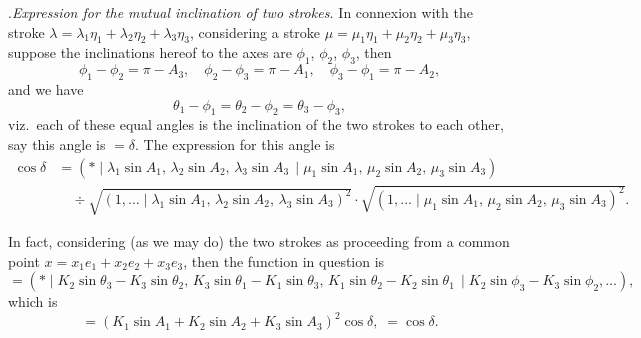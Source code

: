 \documentclass[11pt]{article}
\begin{document}
.\quad \textit{Expression for the mutual inclination of two strokes.} In connexion with the stroke $\lambda = \lambda_{1}\eta_{1} + \lambda_{2}\eta_{2} + \lambda_{3}\eta_{3}$, considering a stroke $\mu = \mu_{1}\eta_{1} + \mu_{2}\eta_{2} + \mu_{3}\eta_{3}$, suppose the inclinations hereof to the axes are $\phi_{1}$, $\phi_{2}$, $\phi_{3}$, then
\[
\phi_{1} - \phi_{2} = \pi - A_{3},\quad \phi_{2} - \phi_{3} = \pi - A_{1},\quad \phi_{3} - \phi_{1} = \pi - A_{2},
\]
and we have
\[
\theta_{1} - \phi_{1} = \theta_{2} - \phi_{2} = \theta_{3} - \phi_{3},
\]
viz.\ each of these equal angles is the inclination of the two strokes to each other, say this angle is $= \delta$. The expression for this angle is
\begin{align*}
\cos\delta &= (*\!\mid\lambda_{1}\sin A_{1},\,\lambda_{2}\sin A_{2},\,\lambda_{3}\sin A_{3}\,\mid\mu_{1}\sin A_{1},\,\mu_{2}\sin A_{2},\,\mu_{3}\sin A_{3}) \\
&\quad \div \sqrt{(1,\ldots\mid\lambda_{1}\sin A_{1},\,\lambda_{2}\sin A_{2},\,\lambda_{3}\sin A_{3})^{2}}\cdot\sqrt{(1,\ldots\mid\mu_{1}\sin A_{1},\,\mu_{2}\sin A_{2},\,\mu_{3}\sin A_{3})^{2}}.
\end{align*}

In fact, considering (as we may do) the two strokes as proceeding from a common point $x = x_{1}e_{1} + x_{2}e_{2} + x_{3}e_{3}$, then the function in question is
\[
= (*\!\mid K_{2}\sin\theta_{3} - K_{3}\sin\theta_{2},\,K_{3}\sin\theta_{1} - K_{1}\sin\theta_{3},\,K_{1}\sin\theta_{2} - K_{2}\sin\theta_{1}\,\mid K_{2}\sin\phi_{3} - K_{3}\sin\phi_{2}, \ldots),
\]
which is
\[
= (K_{1}\sin A_{1} + K_{2}\sin A_{2} + K_{3}\sin A_{3})^{2}\cos\delta,\;= \cos\delta.
\]

\medskip
\end{document}
